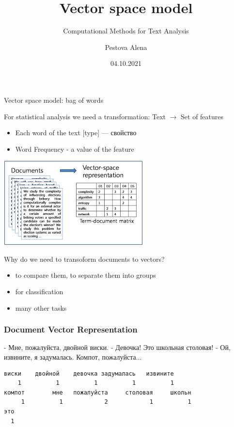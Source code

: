 \documentclass[svgnames]{beamer}
\title[CMTA 04] %
{Vector space model}
\subtitle
{Computational Methods for Text Analysis} %
\author%
{Pestova Alena}
\institute%
{HSE Saint-Petersburg}
\date%
{04.10.2021}
\begin{document}
\begin{frame}
  \titlepage
\end{frame}


\begin{frame}{Vector space model: bag of words}

  \begin{block}{For statistical analysis we need a transformation:}
      Text $\longrightarrow$ Set of features
  \end{block}

  \begin{itemize}
  \item Each word of the text [type] — свойство
  \item Word Frequency - a value of the feature
  \end{itemize}

    \includegraphics[height=.4\textheight]{dtm}
\end{frame}


\begin{frame}
    Why do we need to transoform documents to vectors?
    \begin{itemize}
        \item to compare them, to separate them into groups
        \item for classification
        \item many other tasks
    \end{itemize}
\end{frame}

\begin{frame}[fragile]
  \frametitle{Document Vector Representation}
  \small
  \begin{block}{}
    - Мне, пожалуйста, двойной виски. - Девочка! Это школьная
    столовая! - Ой, извините, я задумалась. Компот, пожалуйста...
  \end{block}
  \footnotesize
\begin{verbatim}
виски    двойной    девочка задумалась   извините
    1          1          1          1          1
компот        мне   пожалуйста     столовая     школьн
     1          1            2            1          1
это
  1
\end{verbatim}
\end{frame}
\end{document}
